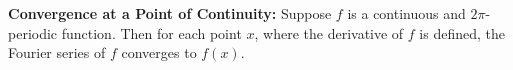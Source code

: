 {\bf Convergence at a Point of Continuity:} Suppose $f$ is a continuous and $2\pi$-periodic function. Then for each point $x$, where the derivative of $f$ is defined, the Fourier series of $f$ converges to $f(x)$.